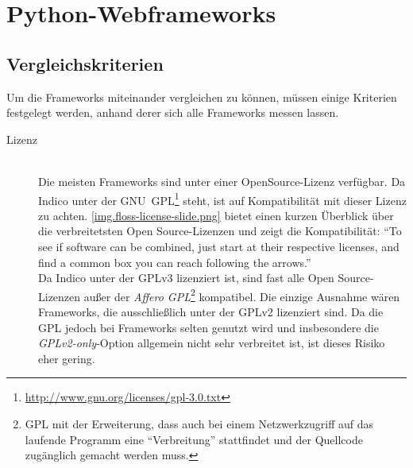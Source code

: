 \chapter{Python-Webframeworks}

\section{Vergleichskriterien}
Um die Frameworks miteinander vergleichen zu können, müssen einige Kriterien festgelegt werden,
anhand derer sich alle Frameworks messen lassen.

\begin{description}
\item[Lizenz] \hfill \\
Die meisten Frameworks sind unter einer OpenSource-Lizenz verfügbar.
Da Indico unter der
GNU~GPL\footnote{\href{http://www.gnu.org/licenses/gpl-3.0.txt}{http://www.gnu.org/licenses/gpl-3.0.txt}}
steht, ist auf Kompatibilität mit dieser Lizenz zu achten. \autoref{img.floss-license-slide.png}
bietet einen kurzen Überblick über die verbreitetsten Open Source-Lizenzen und zeigt die
Kompatibilität: \enquote{To see if software can be combined, just start at their respective
licenses, and find a common box you can reach following the arrows.} \citep{osslic} \\
Da Indico unter der GPLv3 lizenziert ist, sind fast alle Open Source-Lizenzen außer der \emph{Affero
GPL}\footnote{GPL mit der Erweiterung, dass auch bei einem Netzwerkzugriff auf das laufende Programm
eine \enquote{Verbreitung} stattfindet und der Quellcode zugänglich gemacht werden muss.}
kompatibel. Die einzige Ausnahme wären Frameworks, die ausschließlich unter der GPLv2 lizenziert
sind. Da die GPL jedoch bei Frameworks selten genutzt wird und insbesondere die
\emph{GPLv2-only}-Option allgemein nicht sehr verbreitet ist, ist dieses Risiko eher gering.
\end{description}

